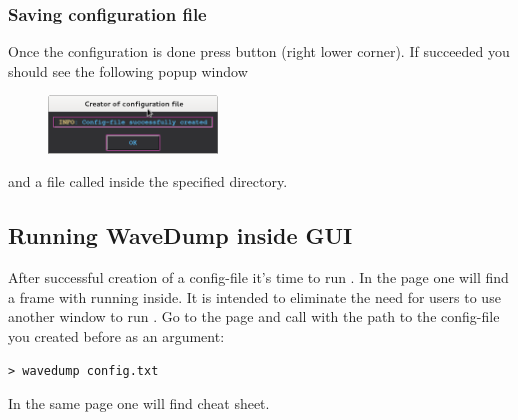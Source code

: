 \subsubsection*{Saving configuration file} 

Once the configuration is done press  
button (right lower corner). If succeeded you should see the following popup window
\begin{figure}[H]
    \centering
    \includegraphics[width=0.4\textwidth]{../pictures/documentation/gui/success.png}
\end{figure} 
\noindent and a file called  inside the specified directory.

\subsection{Running WaveDump inside GUI}
After successful creation of a config-file it's time to run .
In the  page one will find a frame with running  inside.
It is intended to eliminate the need for users to use another window to run .
Go to the  page and call  with the path to the config-file you
created before as an argument:
\begin{lstlisting}
> wavedump config.txt
\end{lstlisting}


In the same page one will find  cheat sheet.  
